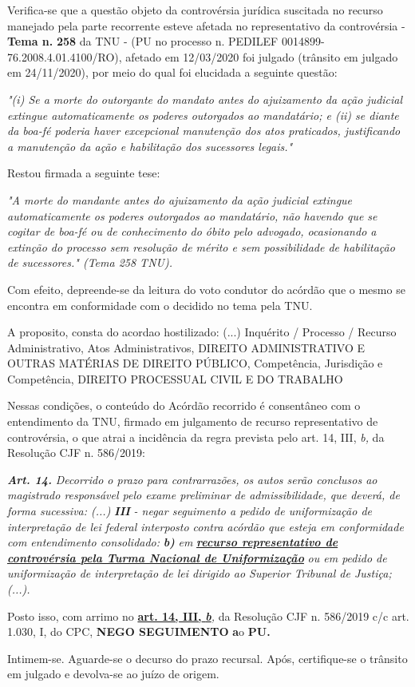 \documentclass[12pt]{article}
\begin{document}
\justifying
\noindent Verifica-se que a questão objeto da controvérsia jurídica suscitada no recurso manejado pela parte recorrente esteve afetada no representativo da controvérsia - \textbf{Tema n. }\textbf{258} da TNU - (PU no processo n. PEDILEF 0014899-76.2008.4.01.4100/RO),  afetado em 12/03/2020 foi julgado (trânsito em julgado em 24/11/2020), por meio do qual foi elucidada a seguinte questão:

\noindent \textit{"(i) Se a morte do outorgante do mandato antes do ajuizamento da ação judicial extingue automaticamente os poderes outorgados ao mandatário; e (ii) se diante da boa-fé poderia haver excepcional manutenção dos atos praticados, justificando a manutenção da ação e habilitação dos sucessores legais."}

\noindent Restou firmada a seguinte tese:

\noindent \textit{"A morte do mandante antes do ajuizamento da ação judicial extingue automaticamente os poderes outorgados ao mandatário, não havendo que se cogitar de boa-fé ou de conhecimento do óbito pelo advogado, ocasionando a extinção do processo sem resolução de mérito e sem possibilidade de habilitação de sucessores." (Tema 258 TNU).}

\noindent Com efeito, depreende-se da leitura do voto condutor do acórdão que o mesmo se encontra em conformidade com o decidido no  tema pela TNU.

\noindent A proposito, consta do acordao hostilizado: (...) Inquérito / Processo / Recurso Administrativo, Atos Administrativos, DIREITO ADMINISTRATIVO E OUTRAS MATÉRIAS DE DIREITO PÚBLICO, Competência, Jurisdição e Competência, DIREITO PROCESSUAL CIVIL E DO TRABALHO

\noindent Nessas condições, o conteúdo do Acórdão recorrido é consentâneo com o entendimento da TNU, firmado em julgamento de recurso representativo de controvérsia, o que atrai a incidência da regra prevista pelo art. 14, III, \textit{b,} da Resolução CJF n. 586/2019:

\noindent \textit{\textbf{Art. 14.}}\textit{ Decorrido o prazo para contrarrazões, os autos serão conclusos ao magistrado responsável pelo exame preliminar de admissibilidade, que deverá, de forma sucessiva: (...) }\textit{\textbf{III }}\textit{- negar seguimento a pedido de uniformização de interpretação de lei federal interposto contra acórdão que esteja em conformidade com entendimento consolidado: }\textit{\textbf{b)}}\textit{ em }\uline{\textit{\textbf{recurso representativo de controvérsia pela Turma Nacional de Uniformização}}}\textit{ ou em pedido de uniformização de interpretação de lei dirigido ao Superior Tribunal de Justiça;(...).}

\noindent Posto isso, com arrimo no \uline{\textbf{art. 14, III, }}\uline{\textit{\textbf{b}}}\textit{,} da Resolução CJF n. 586/2019 c/c art. 1.030, I, do CPC, \textbf{NEGO SEGUIMENTO }\textbf{a}o\textbf{ PU}\textbf{.}

\noindent Intimem-se. Aguarde-se o decurso do prazo recursal. Após, certifique-se o trânsito em julgado e devolva-se ao juízo de origem.
\end{document}
